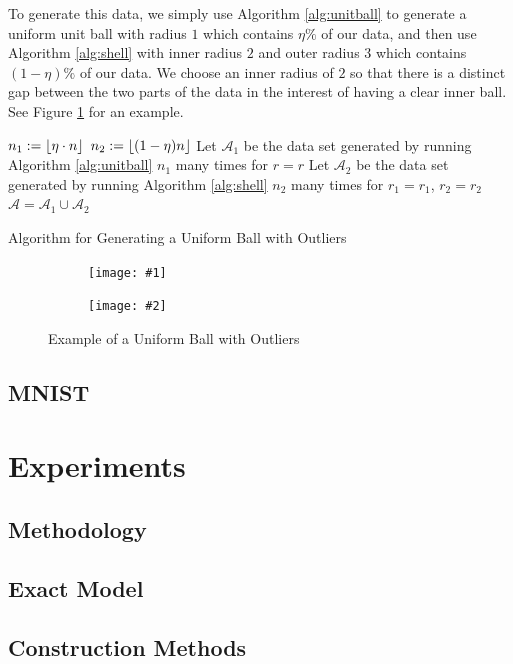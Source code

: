 \documentclass[11pt,twoside]{report}
\newcommand{\A}{\mathcal{A}} %
\newcommand{\datafigure}[4]{
    \begin{figure}
    \centering
    \begin{subfigure}[b]{0.3333\textwidth}
        \centering
        \texttt{[image: \#1]}
    \end{subfigure}
    \begin{subfigure}[b]{0.3333\textwidth}
        \centering
        \texttt{[image: \#2]}
    \end{subfigure}
    \hfill
    \caption{#3}
    \label{#4}
\end{figure}
}
\DeclarePairedDelimiter\floor{\lfloor}{\rfloor}
\theoremstyle{definition}
\numberwithin{theorem}{section}
\numberwithin{definition}{section}
\numberwithin{lemma}{section}
\numberwithin{proposition}{section}
\numberwithin{equation}{section}
\numberwithin{figure}{section}
\begin{document}
To generate this data, we simply use Algorithm \ref{alg:unitball} to generate a uniform unit ball with radius $1$ which contains $\eta\%$ of our data, and then use Algorithm \ref{alg:shell} with inner radius $2$ and outer radius $3$ which contains $(1-\eta)\%$ of our data. We choose an inner radius of $2$ so that there is a distinct gap between the two parts of the data in the interest of having a clear inner ball. See Figure \ref{fig:unifballoutliers} for an example.

\begin{algorithm}
    \KwOut{Data set $\A\subseteq\mathbb{R}^d$}
    
    $n_1:=\floor{\eta\cdot n}$\;
    $n_2:=\floor{(1-\eta)n}$\;
    Let $\A_1$ be the data set generated by running Algorithm \ref{alg:unitball} $n_1$ many times for $r=r$\;
    Let $\A_2$ be the data set generated by running Algorithm \ref{alg:shell} $n_2$ many times for $r_1=r_1$, $r_2=r_2$\;
    $\A=\A_1\cup\A_2$\;
    \KwRet{$\A$}
    
    \caption{Algorithm for Generating a Uniform Ball with Outliers}
    \label{alg:unifballoutliers}
\end{algorithm}

\datafigure{uniform_ball_with_outliers_2d.png}{uniform_ball_with_outliers_3d.png}{Example of a Uniform Ball with Outliers}{fig:unifballoutliers}

\subsection{MNIST}

\section{Experiments}
\subsection{Methodology}
\subsection{Exact Model}\label{exact benchmarks}
\subsection{Construction Methods}
\end{document}
